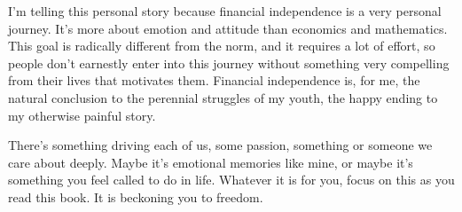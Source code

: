 I'm telling this personal story because financial independence is a very personal journey. It's more about emotion and attitude than economics and mathematics. This goal is radically different from the norm, and it requires a lot of effort, so people don't earnestly enter into this journey without something very compelling from their lives that motivates them. Financial independence is, for me, the natural conclusion to the perennial struggles of my youth, the happy ending to my otherwise painful story.

There's something driving each of us, some passion, something or someone we care about deeply. Maybe it's emotional memories like mine, or maybe it's something you feel called to do in life. Whatever it is for you, focus on this as you read this book. It is beckoning you to freedom.

